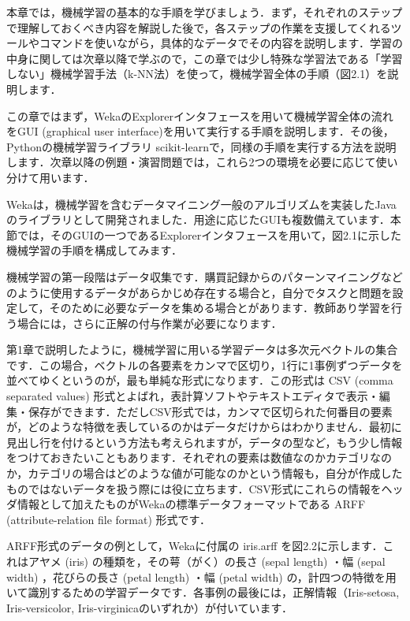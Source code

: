 
本章では，機械学習の基本的な手順を学びましょう．まず，それぞれのステップで理解しておくべき内容を解説した後で，各ステップの作業を支援してくれるツールやコマンドを使いながら，具体的なデータでその内容を説明します．学習の中身に関しては次章以降で学ぶので，この章では少し特殊な学習法である「学習しない」機械学習手法（k-NN法）を使って，機械学習全体の手順（図2.1）を説明します．


この章ではまず，WekaのExplorerインタフェースを用いて機械学習全体の流れをGUI (graphical user interface)を用いて実行する手順を説明します．その後，Pythonの機械学習ライブラリ scikit-learnで，同様の手順を実行する方法を説明します．次章以降の例題・演習問題では，これら2つの環境を必要に応じて使い分けて用います．


Wekaは，機械学習を含むデータマイニング一般のアルゴリズムを実装したJavaのライブラリとして開発されました．用途に応じたGUIも複数備えています．本節では，そのGUIの一つであるExplorerインタフェースを用いて，図2.1に示した機械学習の手順を構成してみます．


機械学習の第一段階はデータ収集です．購買記録からのパターンマイニングなどのように使用するデータがあらかじめ存在する場合と，自分でタスクと問題を設定して，そのために必要なデータを集める場合とがあります．教師あり学習を行う場合には，さらに正解の付与作業が必要になります．

第1章で説明したように，機械学習に用いる学習データは多次元ベクトルの集合です．この場合，ベクトルの各要素をカンマで区切り，1行に1事例ずつデータを並べてゆくというのが，最も単純な形式になります．この形式は CSV (comma separated values) 形式とよばれ，表計算ソフトやテキストエディタで表示・編集・保存ができます．ただしCSV形式では，カンマで区切られた何番目の要素が，どのような特徴を表しているのかはデータだけからはわかりません．最初に見出し行を付けるという方法も考えられますが，データの型など，もう少し情報をつけておきたいこともあります．それぞれの要素は数値なのかカテゴリなのか，カテゴリの場合はどのような値が可能なのかという情報も，自分が作成したものではないデータを扱う際には役に立ちます．CSV形式にこれらの情報をヘッダ情報として加えたものがWekaの標準データフォーマットである
ARFF (attribute-relation file format) 
形式です．

ARFF形式のデータの例として，Wekaに付属の iris.arff を図2.2に示します．これはアヤメ (iris) の種類を，その萼（がく）の長さ (sepal length) ・幅 (sepal width) ，花びらの長さ (petal length) ・幅 (petal width) の，計四つの特徴を用いて識別するための学習データです．各事例の最後には，正解情報（Iris-setosa, Iris-versicolor, Iris-virginicaのいずれか）が付いています． 

